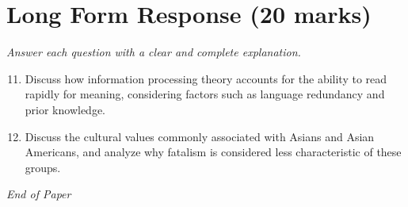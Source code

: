 \documentclass[12pt]{article}
\begin{document}
\section*{Long Form Response (20 marks)}
\textit{Answer each question with a clear and complete explanation.}
\begin{enumerate}[label=\arabic*.]
\setcounter{enumi}{10}
\item Discuss how information processing theory accounts for the ability to read rapidly for meaning, considering factors such as language redundancy and prior knowledge.
\item Discuss the cultural values commonly associated with Asians and Asian Americans, and analyze why fatalism is considered less characteristic of these groups.
\end{enumerate}

\vfill
\noindent\textit{End of Paper}
\end{document}

